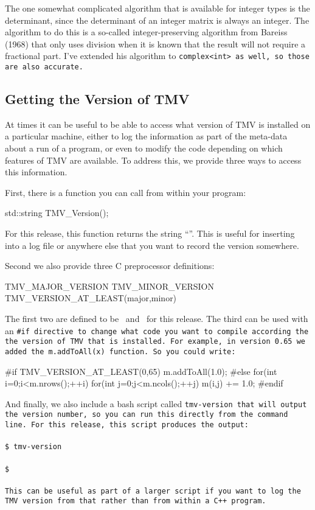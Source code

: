 The one somewhat complicated algorithm that is available for integer types is
the determinant, since the determinant of an integer matrix is always an integer.
The algorithm to do this is a so-called integer-preserving algorithm from Bareiss (1968)
that only uses division when it is known that the result will not require a fractional part.
I've extended his algorithm to \tt{complex<int>} as well, so those are also accurate.

\subsection{Getting the Version of TMV}

At times it can be useful to be able to access what version of TMV is installed on a 
particular machine, either to log the information as part of the meta-data about a
run of a program, or even to modify the code depending on which features of TMV
are available.  To address this, we provide three ways to access this information.

First, there is a function you can call from within your program:
\begin{tmvcode}
std::string TMV_Version();
\end{tmvcode}
For this release, this function returns the string ``\tttmvversion''.  This is useful for inserting
into a log file or anywhere else that you want to record the version somewhere.

Second we also provide three C preprocessor definitions:
\begin{tmvcode}
TMV_MAJOR_VERSION
TMV_MINOR_VERSION
TMV_VERSION_AT_LEAST(major,minor)
\end{tmvcode}
The first two are defined to be \tmvmajorversion\ and \tmvminorversion\ for this release.
The third can be used with an \tt{#if} directive to change what code you want to compile
according the the version of TMV that is installed.
For example, in version 0.65 we added the \tt{m.addToAll(x)} function.  So you could
write:
\begin{tmvcode}
#if TMV_VERSION_AT_LEAST(0,65)
m.addToAll(1.0);
#else
for(int i=0;i<m.nrows();++i) 
    for(int j=0;j<m.ncols();++j)
        m(i,j) += 1.0;
#endif
\end{tmvcode}

And finally, we also include a bash script called \tt{tmv-version} that will output
the version number, so you can run this
directly from the command line.  For this release, this script produces the output:\\ \\
\texttt{\$ tmv-version} \\
\tttmvversion \\
\texttt{\$}\\ \\
This can be useful as part of a larger script if you want to log the TMV version from that
rather than from within a C++ program.  

